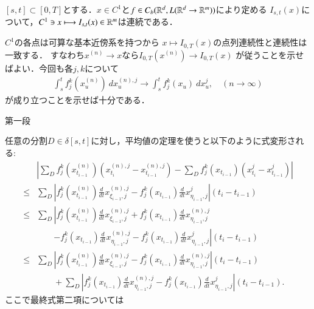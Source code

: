 \begin{screen}
	\begin{thm}
		$[s,t] \subset [0,T]$とする．$x \in C^1$と$f \in C_b(\mathbb{R}^d,L(\mathbb{R}^d \rightarrow \mathbb{R}^m))$により定める
		$I_{s,t}(x)$について，$C^1 \ni x \longmapsto I_{s,t}(x) \in \mathbb{R}^m$は連続である．
	\end{thm}
\end{screen}

\begin{prf}
	$C^1$の各点は可算な基本近傍系を持つから
	$x \longmapsto I_{0,T}(x)$の点列連続性と連続性は一致する．
	すなわち$x^{(n)} \longrightarrow x$なら$I_{0,T}(x^{(n)}) \longrightarrow I_{0,T}(x)$
	が従うことを示せばよい．今回も各$j,k$について
	\begin{align}
		\int_s^t f^k_j(x^{(n)}_u)\ dx^{(n),j}_u
		\longrightarrow \int_s^t f^k_j(x_u)\ dx^j_u,
		\quad (n \longrightarrow \infty)
	\end{align}
	が成り立つことを示せば十分である．
	\begin{description}
		\item[第一段]
	\end{description}
	任意の分割$D \in \delta[s,t]$に対し，平均値の定理を使うと以下のように式変形される:
	\begin{align}
		&\left| \sum_D f^k_j(x^{(n)}_{t_{i-1}})(x^{(n),j}_{t_i} - x^{(n),j}_{t_{i-1}})
			- \sum_D f^k_j(x_{t_{i-1}})(x^j_{t_i} - x^j_{t_{i-1}}) \right| \\
		\leq &\sum_D \left| f^k_j(x^{(n)}_{t_{i-1}}) \tfrac{d}{dt}x^{(n),j}_{\xi_{i-1},j} 
			- f^k_j(x_{t_{i-1}}) \tfrac{d}{dt}x^j_{\eta_{i-1},j} \right|(t_i - t_{i-1}) \\
		\leq &\sum_D \left| f^k_j(x^{(n)}_{t_{i-1}}) \tfrac{d}{dt}x^{(n),j}_{\xi_{i-1},j} 
			+ f^k_j(x_{t_{i-1}}) \tfrac{d}{dt}x^{(n),j}_{\eta_{i-1},j} \right.\\
			&\qquad \left.- f^k_j(x_{t_{i-1}}) \tfrac{d}{dt}x^{(n),j}_{\eta_{i-1},j}
			- f^k_j(x_{t_{i-1}}) \tfrac{d}{dt}x^j_{\eta_{i-1},j} \right|(t_i - t_{i-1}) \\
		\leq &\sum_D \left| f^k_j(x^{(n)}_{t_{i-1}}) \tfrac{d}{dt}x^{(n),j}_{\xi_{i-1},j} 
			- f^k_j(x_{t_{i-1}}) \tfrac{d}{dt}x^{(n),j}_{\eta_{i-1},j} \right|(t_i - t_{i-1}) \\
			&\qquad + \sum_D \left|f^k_j(x_{t_{i-1}}) \tfrac{d}{dt}x^{(n),j}_{\eta_{i-1},j}
			- f^k_j(x_{t_{i-1}}) \tfrac{d}{dt}x^j_{\eta_{i-1},j} \right|(t_i - t_{i-1}).
	\end{align}
	ここで最終式第二項については
	\begin{align}

\end{align}
\end{prf}
